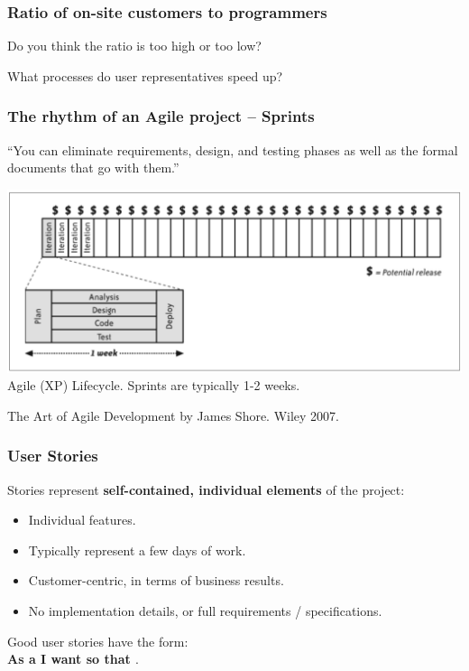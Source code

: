 \documentclass{beamer} %
\newcommand\emc[1]{\textcolor{midred}{\textbf{#1}}}
\begin{document}
\begin{frame}
\frametitle{Ratio of on-site customers to programmers}

Do you think the ratio is too high or too low?

\vspace{5mm}
What processes do user representatives speed up?

\end{frame}



\begin{frame}
\frametitle{The rhythm of an Agile project -- Sprints}

``You can eliminate requirements, design, and testing phases as well as the formal documents that go with them.''

\begin{center}
\includegraphics[scale=0.35]{assets/agile} \\
Agile (XP) Lifecycle. Sprints are typically 1-2 weeks.
\end{center}

{\small The Art of Agile Development by James Shore. Wiley 2007.}

\end{frame}


\begin{frame}

\frametitle{User Stories}

Stories represent \emc{self-contained, individual elements} of the project: 
\begin{itemize}
\item Individual features.
\item Typically represent a few days of work.
\item Customer-centric, in terms of business results.
\item No implementation details, or full requirements / specifications.
\end{itemize}

\vspace{5mm}
Good user stories have the form: \\ \emc{As a {\em <type of user>} I want {\em <some goal>} so that {\em <some reason>}}.

\end{frame}
\end{document}

